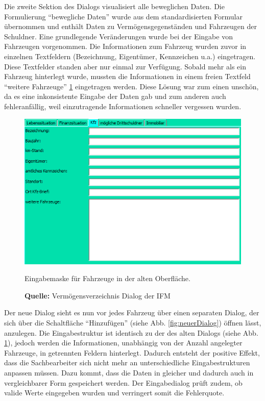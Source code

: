 Die zweite Sektion des Dialogs visualisiert alle beweglichen Daten. Die Formulierung \enquote{bewegliche Daten} wurde aus dem standardisierten Formular übernommen und enthält Daten zu Vermögensgegenständen und Fahrzeugen der Schuldner. Eine grundlegende Veränderungen wurde bei der Eingabe von Fahrzeugen vorgenommen. Die Informationen zum Fahrzeug wurden zuvor in einzelnen Textfeldern (Bezeichnung, Eigentümer, Kennzeichen u.a.) eingetragen. Diese Textfelder standen aber nur einmal zur Verfügung. Sobald mehr als ein Fahrzeug hinterlegt wurde, mussten die Informationen in einem freien Textfeld \enquote{weitere Fahrzeuge} \ref{fig:fahrzeugTab} eingetragen werden. Diese Lösung war zum einen unschön, da es eine inkonsistente Eingabe der Daten gab und zum anderen auch fehleranfällig, weil einzutragende Informationen schneller vergessen wurden.
\begin{figure}[H]
  \centering
  \includegraphics[scale=0.9]{img/FahrzeugTab.PNG}
  \caption{Eingabemaske für Fahrzeuge in der alten Oberfläche.}
    \caption*{\textbf{Quelle:} Vermögensverzeichnis Dialog der IFM}
  \label{fig:fahrzeugTab}
\end{figure}
Der neue Dialog sieht es nun vor jedes Fahrzeug über einen separaten Dialog, der sich über die Schaltfläche \enquote{Hinzufügen} (siehe Abb. \ref{fig:neuerDialog}) öffnen lässt, anzulegen. Die Eingabestruktur ist identisch zu der des alten Dialogs (siehe Abb. \ref{fig:fahrzeugTab}), jedoch werden die Informationen, unabhängig von der Anzahl angelegter Fahrzeuge, in getrennten Feldern hinterlegt. Dadurch entsteht der positive Effekt, dass die Sachbearbeiter sich nicht mehr an unterschiedliche Eingabestrukturen anpassen müssen. Dazu kommt, dass die Daten in gleicher und dadurch auch in vergleichbarer Form gespeichert werden. Der Eingabedialog prüft zudem, ob valide Werte eingegeben wurden und verringert somit die Fehlerquote.
